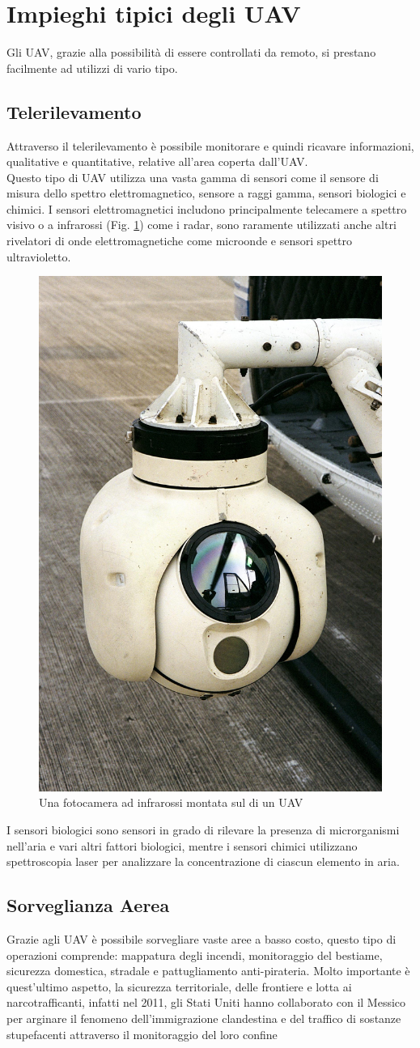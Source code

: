 \section{Impieghi tipici degli UAV}
Gli \ac{UAV}, grazie alla possibilità di essere controllati da remoto, si prestano facilmente ad utilizzi di vario tipo. \\

\subsection*{Telerilevamento}
Attraverso il telerilevamento è possibile monitorare e quindi ricavare informazioni, qualitative e quantitative, 
relative all'area coperta dall'\ac{UAV}. \\
Questo tipo di \ac{UAV} utilizza una vasta gamma di sensori come il sensore di misura dello spettro elettromagnetico, 
sensore a raggi gamma, sensori biologici e chimici. I sensori elettromagnetici includono principalmente telecamere a spettro
visivo o a infrarossi (Fig. \ref{img:infrareduav}) come i radar, sono raramente utilizzati anche altri rivelatori di onde 
elettromagnetiche come microonde e sensori spettro ultravioletto.
\begin{figure}[h]
 \centering
 \includegraphics[height=0.5\textwidth]{Immagini/infrareduav}
 \caption{Una fotocamera ad infrarossi montata sul di un \ac{UAV}}
 \label{img:infrareduav}
\end{figure}

I sensori biologici sono sensori in grado di rilevare la presenza di microrganismi nell'aria e vari altri fattori biologici,
mentre i sensori chimici utilizzano spettroscopia laser per analizzare la concentrazione di ciascun elemento in aria.

\subsection*{Sorveglianza Aerea}
Grazie agli \ac{UAV} è possibile sorvegliare vaste aree a basso costo, questo tipo di operazioni comprende: mappatura degli incendi,
monitoraggio del bestiame, sicurezza domestica, stradale e pattugliamento anti-pirateria.
Molto importante è quest'ultimo aspetto, la sicurezza territoriale, delle frontiere e lotta ai narcotrafficanti, infatti nel 2011,
gli Stati Uniti hanno collaborato con il Messico per arginare il fenomeno dell'immigrazione clandestina e del traffico di sostanze 
stupefacenti attraverso il monitoraggio del loro confine


